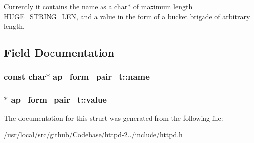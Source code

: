 Currently it contains the name as a char$\ast$ of maximum length H\+U\+G\+E\+\_\+\+S\+T\+R\+I\+N\+G\+\_\+\+L\+EN, and a value in the form of a bucket brigade of arbitrary length. 

\subsection{Field Documentation}
\subsubsection[{\texorpdfstring{name}{name}}]{\setlength{\rightskip}{0pt plus 5cm}const char$\ast$ ap\+\_\+form\+\_\+pair\+\_\+t\+::name}\hypertarget{structap__form__pair__t_ab67919187770ae821be7816447629616}{}\label{structap__form__pair__t_ab67919187770ae821be7816447629616}
\subsubsection[{\texorpdfstring{value}{value}}]{$\ast$ ap\+\_\+form\+\_\+pair\+\_\+t\+::value}\hypertarget{structap__form__pair__t_a9cb7fc0ef3940bd38ff78f6962bc5548}{}\label{structap__form__pair__t_a9cb7fc0ef3940bd38ff78f6962bc5548}


The documentation for this struct was generated from the following file\+:\begin{DoxyCompactItemize}
\item 
/usr/local/src/github/\+Codebase/httpd-\/2../include/\hyperlink{httpd_8h}{httpd.\+h}\end{DoxyCompactItemize}
